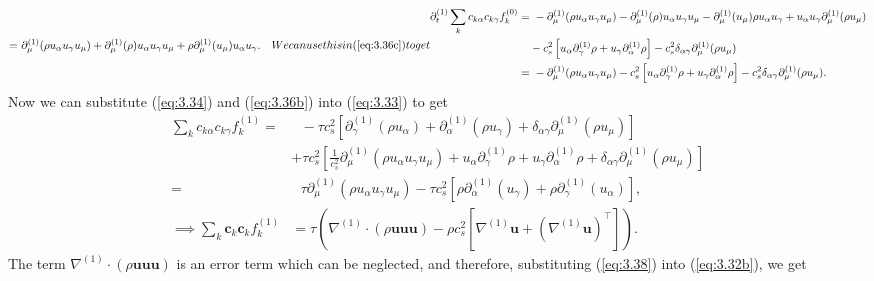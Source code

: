 \documentclass[a4paper, 11pt]{report}
\begin{document}
\begin{subequations}
\begin{align*}
    =& \text{ } \partial_\mu^{(1)}(\rho u_\alpha u_\gamma u_\mu) + \partial_\mu^{(1)}(\rho) u_\alpha u_\gamma u_\mu + \rho\partial_\mu^{(1)}(u_\mu)u_\alpha u_\gamma. 
\end{align*}
We can use this in (\ref{eq:3.36c}) to get
\begin{align}
    \partial_t^{(1)}\sum_kc_{k\alpha}c_{k\gamma}f_k^{(0)}=& \text{ } -\partial_\mu^{(1)}(\rho u_\alpha u_\gamma u_\mu) - \partial_\mu^{(1)}(\rho)u_\alpha u_\gamma u_\mu - \partial_\mu^{(1)}(u_\mu)\rho u_\alpha u_\gamma + u_\alpha u_\gamma \partial_\mu^{(1)}(\rho u_\mu) \nonumber \\
    &- c_s^2\left[u_\alpha\partial_\gamma^{(1)}\rho + u_\gamma\partial_\alpha^{(1)}\rho\right] - c_s^2\delta_{\alpha\gamma}\partial_\mu^{(1)}(\rho u_\mu) \nonumber \\
    =& \text{ } -\partial_\mu^{(1)}(\rho u_\alpha u_\gamma u_\mu) - c_s^2\left[u_\alpha\partial_\gamma^{(1)}\rho + u_\gamma\partial_\alpha^{(1)}\rho\right] - c_s^2\delta_{\alpha\gamma}\partial_\mu^{(1)}(\rho u_\mu). \label{eq:3.36b}
\end{align}
\end{subequations}
Now we can substitute (\ref{eq:3.34}) and (\ref{eq:3.36b}) into (\ref{eq:3.33}) to get
\begin{align}
    \sum_kc_{k\alpha}c_{k\gamma}f_k^{(1)} =& \text{ } -\tau c_s^2\left[\partial_\gamma^{(1)}(\rho u_\alpha) + \partial_\alpha^{(1)}(\rho u_\gamma) + \delta_{\alpha\gamma}\partial_\mu^{(1)}(\rho u_\mu)\right] \nonumber \\
    & + \tau c_s^2 \left[\frac{1}{c_s^2}\partial_\mu^{(1)}(\rho u_\alpha u_\gamma u_\mu) + u_\alpha\partial_\gamma^{(1)}\rho + u_\gamma\partial_\alpha^{(1)}\rho + \delta_{\alpha\gamma}\partial_\mu^{(1)}(\rho u_\mu) \right] \nonumber \\
    =& \text{ } \tau\partial_\mu^{(1)}(\rho u_\alpha u_\gamma u_\mu) -\tau c_s^2 \left[\rho\partial_\alpha^{(1)}(u_\gamma) + \rho\partial_\gamma^{(1)}(u_\alpha) \right], \label{eq:3.37}\\
    \implies \sum_k \mathbf{c}_k \mathbf{c}_kf_k^{(1)} &= \tau\left(\nabla^{(1)}\cdot(\rho\mathbf{uuu})-\rho c_s^2\left[\nabla^{(1)}\mathbf{u} + (\nabla^{(1)}\mathbf{u})^\intercal\right]\right). \label{eq:3.38}
\end{align}
The term $\nabla^{(1)}\cdot(\rho\mathbf{uuu})$ is an error term which can be neglected, and therefore, substituting (\ref{eq:3.38}) into (\ref{eq:3.32b}), we get
\end{document}
